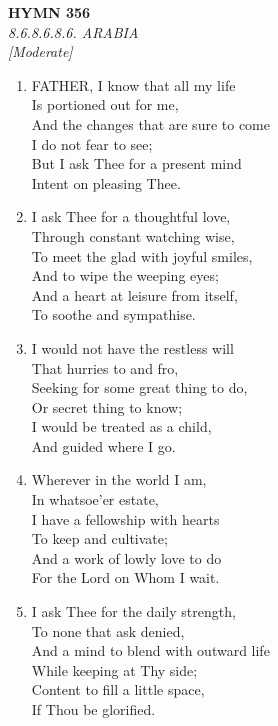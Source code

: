 \documentclass[11pt,a4paper]{article}
\begin{document}
\newpage
\begin{center}
    {\Large \textbf{HYMN 356}}
    \\
    \textit{8.6.8.6.8.6. ARABIA}
    \\
    \textit{\small [Moderate]}
\end{center}
\vspace{1em}

\begin{enumerate}
    \item FATHER, I know that all my life \\
        Is portioned out for me, \\
        And the changes that are sure to come \\
        I do not fear to see; \\
        But I ask Thee for a present mind \\
        Intent on pleasing Thee.

    \item I ask Thee for a thoughtful love, \\
        Through constant watching wise, \\
        To meet the glad with joyful smiles, \\
        And to wipe the weeping eyes; \\
        And a heart at leisure from itself, \\
        To soothe and sympathise.

    \item I would not have the restless will \\
        That hurries to and fro, \\
        Seeking for some great thing to do, \\
        Or secret thing to know; \\
        I would be treated as a child, \\
        And guided where I go.

    \item Wherever in the world I am, \\
        In whatsoe'er estate, \\
        I have a fellowship with hearts \\
        To keep and cultivate; \\
        And a work of lowly love to do \\
        For the Lord on Whom I wait.

    \item I ask Thee for the daily strength, \\
        To none that ask denied, \\
        And a mind to blend with outward life \\
        While keeping at Thy side; \\
        Content to fill a little space, \\
        If Thou be glorified.


\end{enumerate}
\end{document}
